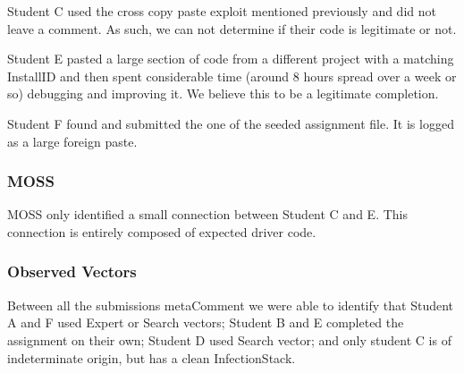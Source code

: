 \documentclass[letterpaper,10pt,conference]{IEEEtran}
\newcommand{\installID}{InstallID\xspace}
\newcommand{\metaComment}{metaComment\xspace}
\newcommand{\infectionStack}{InfectionStack\xspace}
\begin{document}
Student C used the cross copy paste exploit mentioned previously and did not leave a comment.  As such, we can not determine if their code is legitimate or not.

Student E pasted a large section of code from a different project with a matching \installID and then spent considerable time (around 8 hours spread over a week or so) debugging and improving it.  We believe this to be a legitimate completion.

Student F found and submitted the one of the seeded assignment file.  It is logged as a large foreign paste.

\subsubsection{MOSS}
MOSS only identified a small connection between Student C and E.  This connection is entirely composed of expected driver code. 
\subsubsection{Observed Vectors}
Between all the submissions \metaComment we were able to identify that Student A and F used Expert or Search vectors; Student B and E completed the assignment on their own; Student D used Search vector; and only student C is of indeterminate origin, but has a clean \infectionStack.
\end{document}

